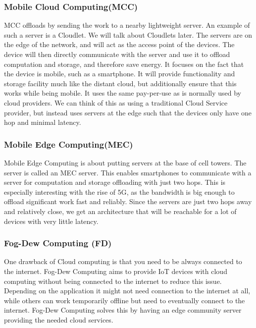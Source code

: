 \subsubsection{Mobile Cloud Computing(MCC)}
MCC offloads by sending the work to a nearby lightweight server. An example of such a server is a Cloudlet. We will talk about Cloudlets later. The servers are on the edge of the network, and will act as the access point of the devices. The device will then directly communicate with the server and use it to offload computation and storage, and therefore save energy. It focuses on the fact that the device is mobile, such as a smartphone. It will provide functionality and storage facility much like the distant cloud, but additionally ensure that this works while being mobile. It uses the same pay-per-use as is normally used by cloud providers. We can think of this as using a traditional Cloud Service provider, but instead uses servers at the edge such that the devices only have one hop and minimal latency.

\subsubsection{Mobile Edge Computing(MEC)}
Mobile Edge Computing is about putting servers at the base of cell towers. The server is called an MEC server. This enables smartphones to communicate with a server for computation and storage offloading with just two hops. This is especially interesting with the rise of 5G, as the bandwidth is big enough to offload significant work fast and reliably. Since the servers are just two hops away and relatively close, we get an architecture that will be reachable for a lot of devices with very little latency.

\subsubsection{Fog-Dew Computing (FD)}
One drawback of Cloud computing is that you need to be always connected to the internet. 
Fog-Dew Computing aims to provide IoT devices with cloud computing without being connected to the internet to reduce this issue. Depending on the application it might not need connection to the internet at all, while others can work temporarily offline but need to eventually connect to the internet. Fog-Dew Computing solves this by having an edge community server providing the needed cloud services. 












